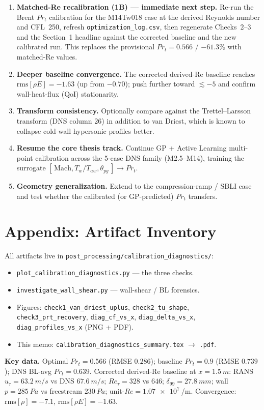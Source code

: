 \documentclass[11pt]{article}
\newcommand{\Prt}{\ensuremath{Pr_t}}
\newcommand{\utau}{\ensuremath{u_\tau}}
\begin{document}
\begin{enumerate}[nosep]
  \item \textbf{Matched-Re recalibration (1B) --- immediate next step.} Re-run the Brent
        \Prt{} calibration for the M14Tw018 case at the derived Reynolds number and
        CFL~250, refresh \texttt{optimization\_log.csv}, then regenerate Checks~2--3 and
        the Section~1 headline against the corrected baseline and the new calibrated run.
        This replaces the provisional $\Prt=0.566$ / $-61.3\%$ with matched-Re values.
  \item \textbf{Deeper baseline convergence.} The corrected derived-Re baseline reaches
        $\mathrm{rms}[\rho E]=-1.63$ (up from $-0.70$); push further toward
        $\lesssim -5$ and confirm wall-heat-flux (QoI) stationarity.
  \item \textbf{Transform consistency.} Optionally compare against the Trettel--Larsson
        transform (DNS column 26) in addition to van Driest, which is known to collapse
        cold-wall hypersonic profiles better.
  \item \textbf{Resume the core thesis track.} Continue GP + Active Learning multi-point
        calibration across the 5-case DNS family (M2.5--M14), training the surrogate
        $[\,\mathrm{Mach}, T_w/T_{aw}, \theta_{pg}\,] \to \Prt$.
  \item \textbf{Geometry generalization.} Extend to the compression-ramp / SBLI case and
        test whether the calibrated (or GP-predicted) \Prt{} transfers.
\end{enumerate}

\section*{Appendix: Artifact Inventory}
\noindent All artifacts live in \texttt{post\_processing/calibration\_diagnostics/}:
\begin{itemize}[nosep]
  \item \texttt{plot\_calibration\_diagnostics.py} --- the three checks.
  \item \texttt{investigate\_wall\_shear.py} --- wall-shear / BL forensics.
  \item Figures: \texttt{check1\_van\_driest\_uplus}, \texttt{check2\_tu\_shape},
        \texttt{check3\_prt\_recovery}, \texttt{diag\_cf\_vs\_x},
        \texttt{diag\_delta\_vs\_x}, \texttt{diag\_profiles\_vs\_x} (PNG + PDF).
  \item This memo: \texttt{calibration\_diagnostics\_summary.tex} $\to$ \texttt{.pdf}.
\end{itemize}

\vspace{0.5em}
\noindent\textbf{Key data.} Optimal $\Prt = 0.566$ (RMSE $0.286$); baseline $\Prt=0.9$
(RMSE $0.739$); DNS BL-avg $\Prt = 0.639$. Corrected derived-Re baseline at
$x=\SI{1.5}{m}$: RANS $\utau = \SI{63.2}{m/s}$ vs DNS $\SI{67.6}{m/s}$;
$Re_\tau = 328$ vs $646$; $\delta_{99}=\SI{27.8}{mm}$; wall $p = \SI{285}{Pa}$ vs
freestream $\SI{230}{Pa}$; unit-$Re=\SI{1.07e7}{}$/m. Convergence:
$\mathrm{rms}[\rho]=-7.1$, $\mathrm{rms}[\rho E]=-1.63$.
\end{document}
